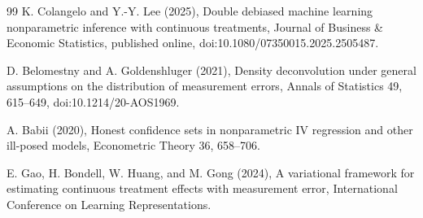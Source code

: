 \documentclass{article}
\begin{document}
\begin{thebibliography}{99}
   K. Colangelo and Y.-Y. Lee (2025), Double debiased machine learning nonparametric inference with continuous treatments, Journal of Business \& Economic Statistics, published online, doi:10.1080/07350015.2025.2505487.

   D. Belomestny and A. Goldenshluger (2021), Density deconvolution under general assumptions on the distribution of measurement errors, Annals of Statistics 49, 615--649, doi:10.1214/20-AOS1969.

   A. Babii (2020), Honest confidence sets in nonparametric IV regression and other ill-posed models, Econometric Theory 36, 658--706.

   E. Gao, H. Bondell, W. Huang, and M. Gong (2024), A variational framework for estimating continuous treatment effects with measurement error, International Conference on Learning Representations.

\end{thebibliography}
\end{document}
